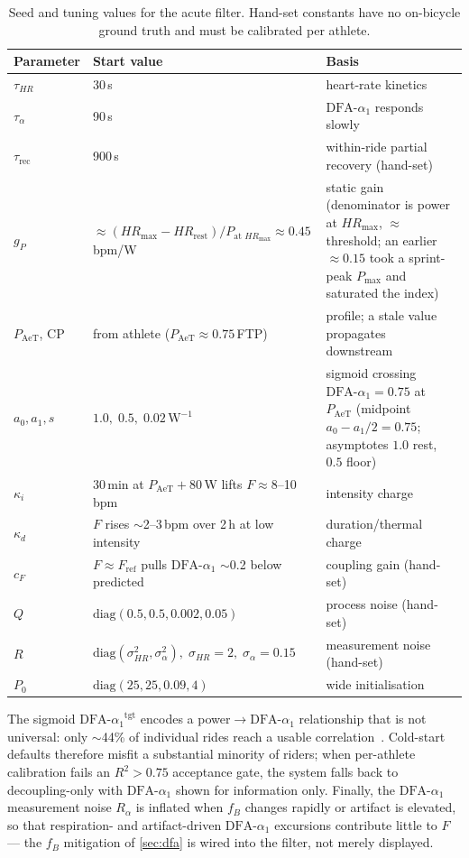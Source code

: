 \documentclass[11pt]{article}
\newcommand{\aone}{\ensuremath{\text{DFA-}\alpha_1}}
\newcommand{\Fstate}{\ensuremath{F}}
\begin{document}
\begin{table}[h]
\centering
\small
\caption{Seed and tuning values for the acute filter. Hand-set constants have no on-bicycle ground truth and must be calibrated per athlete.}
\label{tab:tuning}
\begin{tabularx}{\linewidth}{@{}l l X@{}}
\toprule
\textbf{Parameter} & \textbf{Start value} & \textbf{Basis} \\
\midrule
$\tau_{HR}$ & 30\,s & heart-rate kinetics \\
$\tau_{\alpha}$ & 90\,s & $\aone$ responds slowly \\
$\tau_{\text{rec}}$ & 900\,s & within-ride partial recovery (hand-set) \\
$g_P$ & $\approx (HR_{\max}-HR_{\text{rest}})/P_{\text{at }HR_{\max}}\approx 0.45$\,bpm/W & static gain (denominator is power at $HR_{\max}$, $\approx$ threshold; an earlier $\approx0.15$ took a sprint-peak $P_{\max}$ and saturated the index) \\
$P_{\text{AeT}}$, CP & from athlete ($P_{\text{AeT}}\approx 0.75\,$FTP) & profile; a stale value propagates downstream \\
$a_0,a_1,s$ & $1.0,\;0.5,\;0.02\,\text{W}^{-1}$ & sigmoid crossing $\aone=0.75$ at $P_{\text{AeT}}$ (midpoint $a_0-a_1/2=0.75$; asymptotes $1.0$ rest, $0.5$ floor) \\
$\kappa_i$ & 30\,min at $P_{\text{AeT}}{+}80$\,W lifts $\Fstate\approx 8$--10\,bpm & intensity charge \\
$\kappa_d$ & $\Fstate$ rises $\sim$2--3\,bpm over 2\,h at low intensity & duration/thermal charge \\
$c_F$ & $\Fstate\approx F_{\text{ref}}$ pulls $\aone$ $\sim$0.2 below predicted & coupling gain (hand-set) \\
$Q$ & $\mathrm{diag}(0.5,0.5,0.002,0.05)$ & process noise (hand-set) \\
$R$ & $\mathrm{diag}(\sigma_{HR}^2,\sigma_{\alpha}^2),\;\sigma_{HR}{=}2,\;\sigma_{\alpha}{=}0.15$ & measurement noise (hand-set) \\
$P_0$ & $\mathrm{diag}(25,25,0.09,4)$ & wide initialisation \\
\bottomrule
\end{tabularx}
\end{table}

The sigmoid $\aone^{\text{tgt}}$ encodes a power$\rightarrow$$\aone$ relationship that is not universal: only $\sim$44\% of individual rides reach a usable correlation~\cite{powera1}. Cold-start defaults therefore misfit a substantial minority of riders; when per-athlete calibration fails an $R^2>0.75$ acceptance gate, the system falls back to decoupling-only with $\aone$ shown for information only. Finally, the $\aone$ measurement noise $R_\alpha$ is inflated when $f_B$ changes rapidly or artifact is elevated, so that respiration- and artifact-driven $\aone$ excursions contribute little to $\Fstate$ --- the $f_B$ mitigation of \autoref{sec:dfa} is wired into the filter, not merely displayed.
\end{document}
